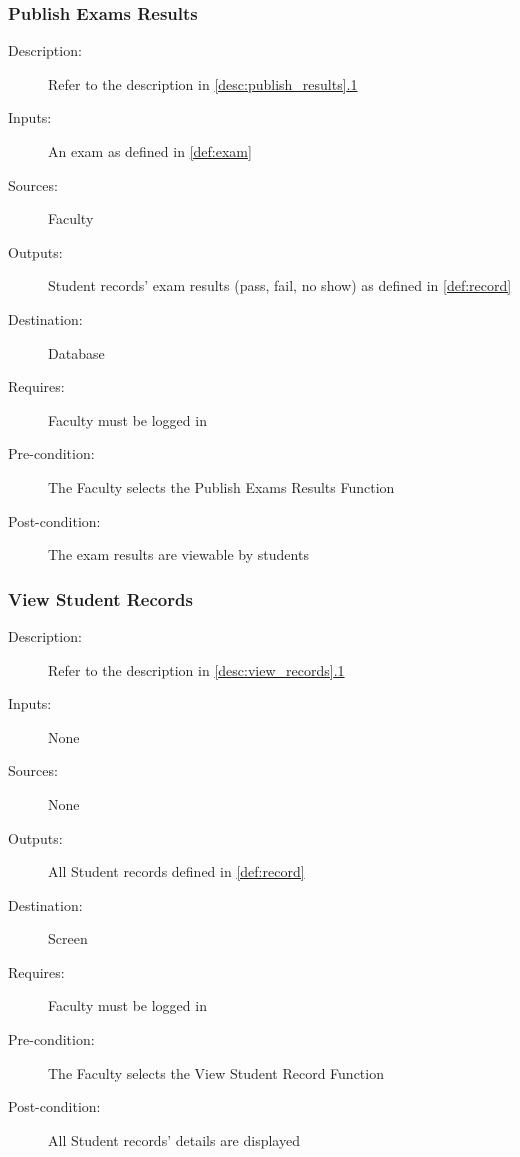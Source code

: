 \subsubsection{\large Publish Exams Results} 
\begin{boxed} %
\begin{description}
\item[Description:]
   Refer to the description in \autoref{desc:publish_results}\hyperref[desc:publish_results]{.1}
\item[Inputs:]
   An exam as defined in \autoref{def:exam}
\item[Sources:]
   Faculty
\item[Outputs:]
   Student records' exam results (pass, fail, no show) as defined in
   \autoref{def:record}
\item[Destination:]
   Database
\item[Requires:]
   Faculty must be logged in
\item[Pre-condition:]
   The Faculty selects the Publish Exams Results Function
\item[Post-condition:]
   The exam results are viewable by students
\end{description}
\end{boxed} %

\subsubsection{\large View Student Records} 
\begin{boxed} %
\begin{description}
\item[Description:]
   Refer to the description in \autoref{desc:view_records}\hyperref[desc:view_records]{.1}
\item[Inputs:]
   None
\item[Sources:]
   None
\item[Outputs:]
   All Student records defined in \autoref{def:record}
\item[Destination:]
   Screen
\item[Requires:]
   Faculty must be logged in
\item[Pre-condition:]
   The Faculty selects the View Student Record Function
\item[Post-condition:]
   All Student records' details are displayed
\end{description}
\end{boxed} %

